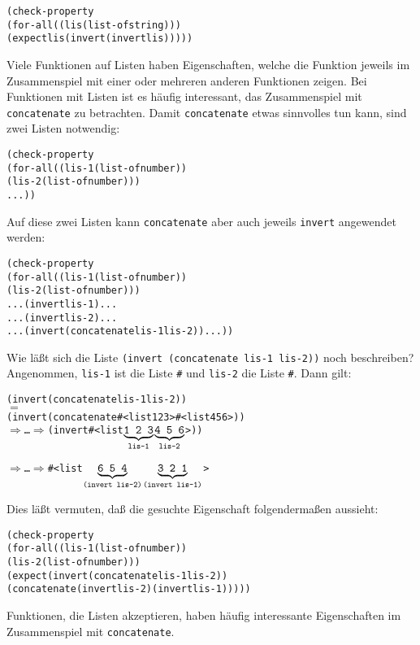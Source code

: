 \begin{alltt}
(check-property
 (for-all ((lis (list-of string)))
   (expect lis (invert (invert lis)))))
\end{alltt}
%
Viele Funktionen auf Listen haben Eigenschaften, welche die Funktion
jeweils im Zusammenspiel mit einer oder mehreren anderen Funktionen
zeigen.  Bei Funktionen mit Listen ist es häufig interessant, das
Zusammenspiel mit \texttt{concatenate} zu betrachten.  Damit
\texttt{concatenate} etwas sinnvolles tun kann, sind zwei Listen
notwendig:
%
\begin{alltt}
(check-property
  (for-all ((lis-1 (list-of number))
            (lis-2 (list-of number)))
    ...))
\end{alltt}
%
Auf diese zwei Listen kann \texttt{concatenate} aber auch jeweils
\texttt{invert} angewendet werden:
%
%
\begin{alltt}
(check-property
  (for-all ((lis-1 (list-of number))
            (lis-2 (list-of number)))
    ... (invert lis-1) ...
    ... (invert lis-2) ...
    ... (invert (concatenate lis-1 lis-2)) ...))
\end{alltt}
%
Wie läßt sich die Liste \texttt{(invert (concatenate lis-1 lis-2))}
noch beschreiben?
Angenommen, \texttt{lis-1} ist die Liste \texttt{\#<list 1 2 3>} und
\texttt{lis-2} die Liste \texttt{\#<list 4 5 6>}.  Dann gilt:
%
\begin{alltt}
(invert (concatenate lis-1 lis-2))
\(=\)
(invert (concatenate #<list 1 2 3> #<list 4 5 6>))
\(\Longrightarrow\) \ldots{} \(\Longrightarrow\) (invert #<list \(\underbrace{\texttt{1 2 3}}\sb{\texttt{lis-1}}\) \(\underbrace{\texttt{4 5 6}}\sb{\texttt{lis-2}}\)>))

\(\Longrightarrow\) \ldots{} \(\Longrightarrow\) #<list \(\underbrace{\texttt{6 5 4}}\sb{\texttt{(invert lis-2)}}\) \(\underbrace{\texttt{3 2 1}}\sb{\texttt{(invert lis-1)}}\)>
\end{alltt}
%
Dies läßt vermuten, daß die gesuchte Eigenschaft folgendermaßen aussieht:
%
\begin{alltt}
(check-property
 (for-all ((lis-1 (list-of number))
           (lis-2 (list-of number)))
   (expect (invert (concatenate lis-1 lis-2))
           (concatenate (invert lis-2) (invert lis-1)))))
\end{alltt}
%
\begin{mantra}
  Funktionen, die Listen akzeptieren, haben häufig interessante
  Eigenschaften im Zusammenspiel mit \texttt{concatenate}.
\end{mantra}


